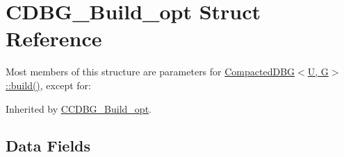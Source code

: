 \hypertarget{structCDBG__Build__opt}{}\section{C\+D\+B\+G\+\_\+\+Build\+\_\+opt Struct Reference}
\label{structCDBG__Build__opt}


Most members of this structure are parameters for \hyperlink{classCompactedDBG_a6021ad2fe7b11998b886bc5fd9e1a4ba}{Compacted\+D\+B\+G$<$\+U, G$>$\+::build()}, except for\+:  




Inherited by \hyperlink{structCCDBG__Build__opt}{C\+C\+D\+B\+G\+\_\+\+Build\+\_\+opt}.

\subsection*{Data Fields}

